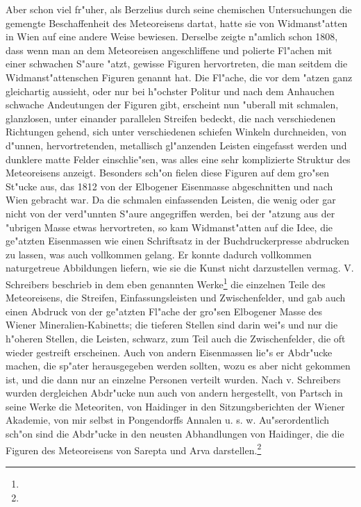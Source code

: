\documentclass[a4paper, 11pt, oneside]{article}
\begin{document}
Aber schon viel fr"uher, als Berzelius durch seine chemischen Untersuchungen die gemengte Beschaffenheit des Meteoreisens dartat, hatte sie von Widmanst"atten in Wien auf eine andere Weise bewiesen. Derselbe zeigte n"amlich schon 1808, dass wenn man an dem Meteoreisen angeschliffene und polierte Fl"achen mit einer schwachen S"aure "atzt, gewisse Figuren hervortreten, die man seitdem die Widmanst"attenschen Figuren genannt hat. Die Fl"ache, die vor dem "atzen ganz gleichartig aussieht, oder nur bei h"ochster Politur und nach dem Anhauchen schwache Andeutungen der Figuren gibt, erscheint nun "uberall mit schmalen, glanzlosen, unter einander parallelen Streifen bedeckt, die nach verschiedenen Richtungen gehend, sich unter verschiedenen schiefen Winkeln durchneiden, von d"unnen, hervortretenden, metallisch gl"anzenden Leisten eingefasst werden und dunklere matte Felder einschlie"sen, was alles eine sehr komplizierte Struktur des Meteoreisens anzeigt. Besonders sch"on fielen diese Figuren auf dem gro"sen St"ucke aus, das 1812 von der Elbogener Eisenmasse abgeschnitten und nach Wien gebracht war. Da die schmalen einfassenden Leisten, die wenig oder gar nicht von der verd"unnten S"aure angegriffen werden, bei der "atzung aus der "ubrigen Masse etwas hervortreten, so kam Widmanst"atten auf die Idee, die ge"atzten Eisenmassen wie einen Schriftsatz in der Buchdruckerpresse abdrucken zu lassen, was auch vollkommen gelang. Er konnte dadurch vollkommen naturgetreue Abbildungen liefern, wie sie die Kunst nicht darzustellen vermag. V. Schreibers beschrieb in dem eben genannten Werke\footnote{} die einzelnen Teile des Meteoreisens, die Streifen, Einfassungsleisten und Zwischenfelder, und gab auch einen Abdruck von der ge"atzten Fl"ache der gro"sen Elbogener Masse des Wiener Mineralien-Kabinetts; die tieferen Stellen sind darin wei"s und nur die h"oheren Stellen, die Leisten, schwarz, zum Teil auch die Zwischenfelder, die oft wieder gestreift erscheinen. Auch von andern Eisenmassen lie"s er Abdr"ucke machen, die sp"ater herausgegeben werden sollten, wozu es aber nicht gekommen ist, und die dann nur an einzelne Personen verteilt wurden. Nach v. Schreibers wurden dergleichen Abdr"ucke nun auch von andern hergestellt, von Partsch in seine Werke die Meteoriten, von Haidinger in den Sitzungsberichten der Wiener Akademie, von mir selbst in Pongendorffs Annalen u. s. w. Au"serordentlich sch"on sind die Abdr"ucke in den neusten Abhandlungen von Haidinger, die die Figuren des Meteoreisens von Sarepta und Arva darstellen.\footnote{}
\end{document}
